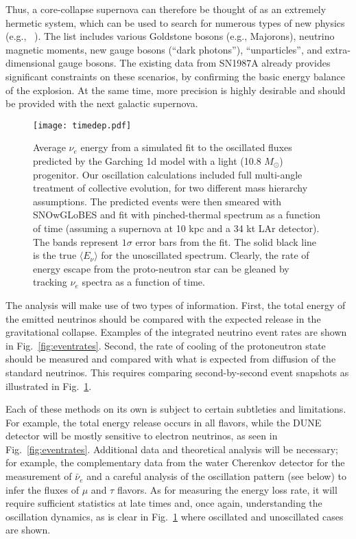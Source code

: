 Thus, a core-collapse supernova can therefore be thought of as an extremely hermetic system, which can be used to search for numerous types of new physics (e.g., ~\cite{Raffelt:1999tx}). The list includes various Goldstone bosons (e.g., Majorons), neutrino magnetic moments, new gauge bosons (``dark photons''), ``unparticles'', and extra-dimensional gauge bosons. The existing data from SN1987A already provides significant constraints on these scenarios, by confirming the basic energy balance of the explosion. At the same time, more precision is highly desirable and should be provided with the next galactic supernova. 

\begin{figure}[!htb]
\centering
\texttt{[image: timedep.pdf]}
\caption[Simulated cooling curves from the Garching light progenitor model]{ Average $\nu_{e}$ energy from a simulated fit to the oscillated fluxes predicted by the Garching 1d model with a light (10.8 $M_{\odot}$) progenitor. Our oscillation calculations included full multi-angle treatment of collective evolution, for two
different mass hierarchy assumptions. The predicted events were then smeared with SNOwGLoBES and fit with pinched-thermal spectrum as a function of time (assuming a supernova at 10 kpc and a 34 kt LAr detector). The bands represent $1\sigma$ error bars from the fit. The solid black line is the true
$\langle E_{\nu} \rangle$ for the unoscillated spectrum. Clearly, the rate of energy escape from the proto-neutron star can be gleaned by tracking $\nu_{e}$ spectra as a function of time.}
\label{fig:coolingcurves}
\end{figure}


The analysis will make use of two types of information. First, the total energy of the emitted neutrinos should be compared with the expected release in the gravitational collapse. Examples of the integrated neutrino event rates are shown in Fig.~\ref{fig:eventrates}. Second, the rate of cooling of the protoneutron state should be measured and compared with what is expected from diffusion of the standard neutrinos. This requires comparing second-by-second event snapshots as illustrated in Fig.~\ref{fig:coolingcurves}. 

Each of these methods on its own is subject to certain subtleties and limitations. For example, the total energy release occurs in all flavors, while the DUNE detector will be mostly sensitive to electron neutrinos, as seen in Fig.~\ref{fig:eventrates}. Additional data and theoretical analysis will be necessary; for example, the complementary data from the water Cherenkov detector for the measurement of $\bar\nu_{e}$ and a careful analysis of the oscillation pattern (see below) to infer the fluxes of $\mu$ and $\tau$ flavors. As for measuring the energy loss rate, it will require sufficient statistics at late times and, once again, understanding the oscillation dynamics, as is clear in Fig.~\ref{fig:coolingcurves} where oscillated and unoscillated cases are shown.

